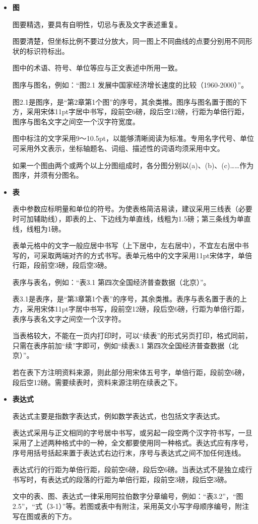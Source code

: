 \begin{itemize}
  \item \textbf{图}
  
  图要精选，要具有自明性，切忌与表及文字表述重复。
  
  图要清楚，但坐标比例不要过分放大，同一图上不同曲线的点要分别用不同形状的标识符标出。
  
  图中的术语、符号、单位等应与正文表述中所用一致。
  
  图序与图名，例如：“图2.1  发展中国家经济增长速度的比较（1960-2000）”。
  
  图2.1是图序，是“第2章第1个图”的序号，其余类推。图序与图名置于图的下方，采用宋体11pt字居中书写，段前空6磅，段后空12磅，行距为单倍行距，图序与图名文字之间空一个汉字符宽度。
  
  图中标注的文字采用9～10.5pt，以能够清晰阅读为标准。专用名字代号、单位可采用外文表示，坐标轴题名、词组、描述性的词语均须采用中文。
  
  如果一个图由两个或两个以上分图组成时，各分图分别以(a)、(b)、(c)……作为图序，并须有分图名。

  \item \textbf{表}
  
  表中参数应标明量和单位的符号。为使表格简洁易读，建议采用三线表（必要时可加辅助线），即表的上、下边线为单直线，线粗为1.5磅；第三条线为单直线，线粗为1磅。
  
  表单元格中的文字一般应居中书写（上下居中，左右居中），不宜左右居中书写的，可采取两端对齐的方式书写。表单元格中的文字采用11pt宋体字，单倍行距，段前空3磅，段后空3磅。
  
  表序与表名，例如：“表3.1  第四次全国经济普查数据（北京）”。
  
  表3.1是表序，是“第3章第1个表”的序号，其余类推。表序与表名置于表的上方，采用宋体11pt字居中书写，段前空12磅，段后空6磅，行距为单倍行距，表序与表名文字之间空一个汉字符。
  
  当表格较大，不能在一页内打印时，可以“续表”的形式另页打印，格式同前，只需在表序前加“续”字即可，例如“续表3.1  第四次全国经济普查数据（北京）”。
  
  若在表下方注明资料来源，则此部分用宋体五号字，单倍行距，段前空6磅，段后空12磅。需要续表时，资料来源注明在续表之下。

  \item \textbf{表达式}
  
  表达式主要是指数字表达式，例如数学表达式，也包括文字表达式。
  
  表达式采用与正文相同的字号居中书写，或另起一段空两个汉字符书写，一旦采用了上述两种格式中的一种，全文都要使用同一种格式。表达式应有序号，序号用括号括起来置于表达式右边行末，序号与表达式之间不加任何连线。
  
  表达式行的行距为单倍行距，段前空6磅，段后空6磅。当表达式不是独立成行书写时，有表达式的段落的行距为单倍行距，段前空3磅，段后空3磅。
  
  文中的表、图、表达式一律采用阿拉伯数字分章编号，例如：“表3.2”，“图2.5”，“式（3-1）”等。若图或表中有附注，采用英文小写字母顺序编号，附注写在图或表的下方。
\end{itemize}

